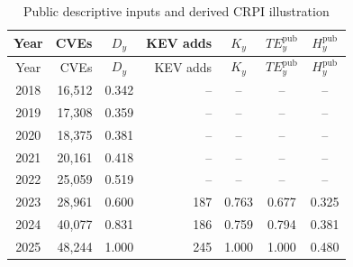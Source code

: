 \documentclass[11pt]{article}
\begin{document}
\begingroup
\small
\setlength{\tabcolsep}{4pt}
\begin{longtable}{c r c r c c c}
  \caption{Public descriptive inputs and derived CRPI illustration}
  \label{tab:ai-public-proxy}\\
  \toprule
  Year & CVEs & $D_y$ & KEV adds & $K_y$ & $TE^{\mathrm{pub}}_y$ & $H^{\mathrm{pub}}_y$ \\
  \midrule
  \endfirsthead
  \toprule
  Year & CVEs & $D_y$ & KEV adds & $K_y$ & $TE^{\mathrm{pub}}_y$ & $H^{\mathrm{pub}}_y$ \\
  \midrule
  \endhead
  2018 & 16,512 & 0.342 & -- & -- & -- & -- \\
  2019 & 17,308 & 0.359 & -- & -- & -- & -- \\
  2020 & 18,375 & 0.381 & -- & -- & -- & -- \\
  2021 & 20,161 & 0.418 & -- & -- & -- & -- \\
  2022 & 25,059 & 0.519 & -- & -- & -- & -- \\
  2023 & 28,961 & 0.600 & 187 & 0.763 & 0.677 & 0.325 \\
  2024 & 40,077 & 0.831 & 186 & 0.759 & 0.794 & 0.381 \\
  2025 & 48,244 & 1.000 & 245 & 1.000 & 1.000 & 0.480 \\
  \bottomrule
\end{longtable}
\endgroup
\end{document}
